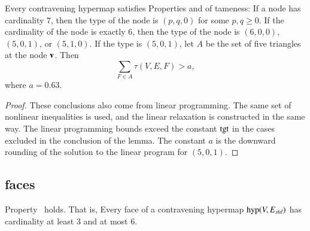 \begin{lemma}\label{lemma:degE}
Every contravening hypermap satisfies Properties  and 
of tameness: 
If a node has cardinality $7$, then the type of the
       node is $(p,q,0)$ for some $p,q\ge0$.   If the
        cardinality of the node is exactly $6$, then the type of the node
        is $(6,0,0)$, $(5,0,1)$, or $(5,1,0)$.
If the type is $(5,0,1)$, let $A$ be the set of five triangles at the
node ${\mathbf v}$.  Then
%
%
$$
\sum_{F\in A} \tau(V,E,F) > a,
$$
where $a=0.63$.
\end{lemma}



\begin{proof} These conclusions also come from linear programming.
The same set of nonlinear inequalities is used, and the linear
relaxation is constructed in the same way.  The linear programming
bounds exceed the constant ${\operatorname{tgt}}$ in the cases excluded in the conclusion
of the lemma.  The constant $a$ is the downward rounding of the solution to the linear program for $(5,0,1)$.
\end{proof}
%

%

\subsection{faces}



\begin{lemma}  \label{lemma:face-size}
Property~ holds.  That is,
Every face of a contravening hypermap ${\operatorname{hyp}}(V,E_{std})$ has cardinality at least $3$ and at most $6$.
\end{lemma}

